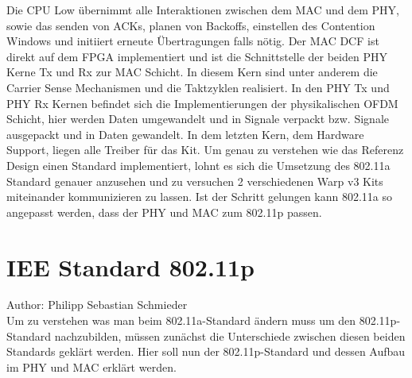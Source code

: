 \documentclass[letterpaper,11pt]{article}
\begin{document}
\begin{onehalfspace}
Die CPU Low übernimmt alle Interaktionen zwischen dem MAC und dem PHY, sowie das senden von ACKs, planen von Backoffs, einstellen des Contention Windows und initiiert erneute Übertragungen falls nötig.
Der MAC DCF ist direkt auf dem FPGA implementiert und ist die Schnittstelle der beiden PHY Kerne Tx und Rx zur MAC Schicht. In diesem Kern sind unter anderem die Carrier Sense Mechanismen und die Taktzyklen realisiert.
In den PHY Tx und PHY Rx Kernen befindet sich die Implementierungen der physikalischen OFDM Schicht, hier werden Daten umgewandelt und in Signale verpackt bzw. Signale ausgepackt und in Daten gewandelt. In dem letzten Kern, dem Hardware Support, liegen alle Treiber für das Kit.
Um genau zu verstehen wie das Referenz Design einen Standard implementiert, lohnt es sich die Umsetzung des 802.11a Standard genauer anzusehen und zu versuchen 2 verschiedenen Warp v3 Kits miteinander kommunizieren zu lassen. Ist der Schritt gelungen kann 802.11a so angepasst werden, dass der PHY und MAC zum 802.11p passen.
\section{IEE Standard 802.11p}
\label{802.11p}
\small Author: Philipp Sebastian Schmieder\\
\Large
Um zu verstehen was man beim 802.11a-Standard ändern muss um den 802.11p-Standard nachzubilden, müssen zunächst die Unterschiede zwischen diesen beiden Standards geklärt werden. Hier soll nun der 802.11p-Standard und dessen Aufbau im PHY und MAC erklärt werden.

\end{onehalfspace}
\end{document}
